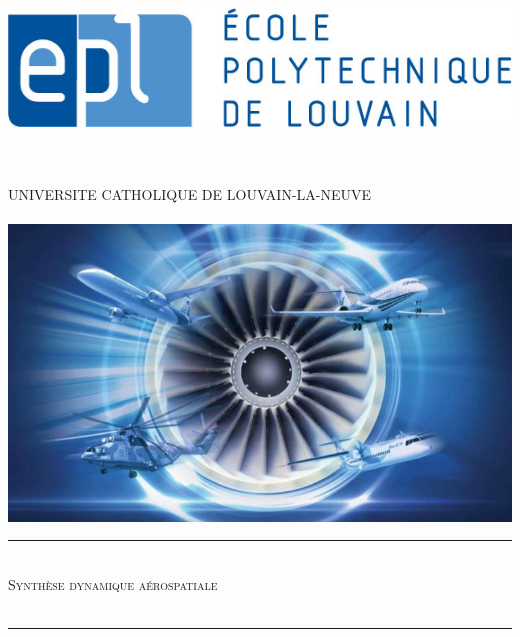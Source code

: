 \begin{titlepage}

\newcommand{\HRule}{\rule{\linewidth}{0.5mm}} %

\center %

\begin{minipage}{0.2\textwidth}
\begin{flushleft} \large
\includegraphics[scale=0.3]{epl-logo.jpg}
\end{flushleft}
\end{minipage}
\begin{minipage}{0.6\textwidth}
\begin{flushright} \large
\end{flushright}
\end{minipage}\\[0.2cm]
\\
[0.5cm]
{\Large UNIVERSITE CATHOLIQUE DE LOUVAIN-LA-NEUVE}\\[0.1Cm]
\\
[0.7cm]
\includegraphics[scale=0.5]{1.png}
\\[1.5cm]
\HRule \\[0.4cm]
{ \huge \textsc{Synthèse dynamique aérospatiale\\ }}\\[0.15cm] %
\HRule \\[3cm]
 

\end{titlepage}
